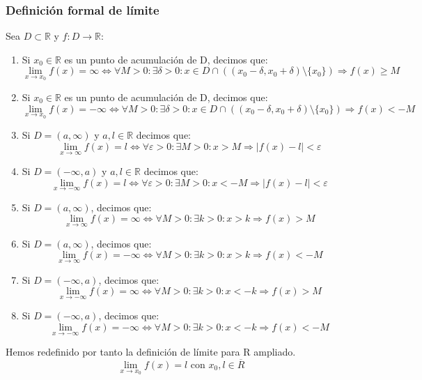 \documentclass[10pt,a4paper,openright]{book}
\begin{document}
\subsubsection*{Definición formal de límite}
Sea $D\subset \mathbb R$ y $f: D\longrightarrow \mathbb R$:
\begin{enumerate}
\item Si $x_0\in \mathbb R$ es un punto de acumulación de D, decimos que:
$$\lim_{x\rightarrow x_0}f(x)=\infty\Leftrightarrow\forall M>0: \exists \delta>0: x\in D\cap \left((x_0-\delta, x_0+\delta)\mbox{\textbackslash}\{x_0\}\right)\Rightarrow f(x)\geq M$$

\item Si $x_0\in \mathbb R$ es un punto de acumulación de D, decimos que:
$$\lim_{x\rightarrow x_0}f(x)=-\infty \Leftrightarrow\forall M>0: \exists \delta>0: x\in D\cap \left((x_0-\delta, x_0+\delta)\mbox{\textbackslash}\{x_0\}\right)\Rightarrow f(x)<-M$$

\item Si $D=(a, \infty)$ y $a,l\in \mathbb R$ decimos que:
$$\lim_{x\rightarrow \infty}f(x)=l\Leftrightarrow \forall \varepsilon>0: \exists M>0: x>M\Rightarrow |f(x)-l|<\varepsilon$$

\item Si $D=(-\infty, a)$ y $a,l\in \mathbb R$ decimos que:
$$\lim_{x\rightarrow -\infty}f(x)=l\Leftrightarrow \forall \varepsilon>0: \exists M>0: x< -M\Rightarrow |f(x)-l|<\varepsilon$$

\item Si $D=(a,\infty)$, decimos que:
$$\lim_{x\rightarrow \infty}f(x)=\infty \Leftrightarrow \forall M>0: \exists k>0:  x>k \Rightarrow f(x)>M$$

\item Si $D=(a,\infty)$, decimos que:
$$\lim_{x\rightarrow \infty}f(x)=-\infty \Leftrightarrow \forall M>0: \exists k>0:  x>k \Rightarrow f(x)<-M$$

\item Si $D=(-\infty,a)$, decimos que:
$$\lim_{x\rightarrow -\infty}f(x)=\infty \Leftrightarrow \forall M>0: \exists k>0:  x<-k \Rightarrow f(x)>M$$

\item Si $D=(-\infty,a)$, decimos que:
$$\lim_{x\rightarrow -\infty}f(x)=-\infty \Leftrightarrow \forall M>0: \exists k>0:  x<-k \Rightarrow f(x)<-M$$
\end{enumerate}

Hemos redefinido por tanto la definición de límite para R ampliado.
$$\lim_{x\rightarrow x_0}f(x)=l\mbox{ con }x_0,l\in \overline{R}$$
\end{document}
